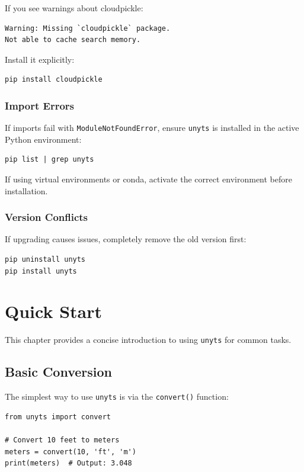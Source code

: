 \documentclass[11pt,a4paper]{report}
\begin{document}
If you see warnings about cloudpickle:
\begin{lstlisting}[style=bashstyle]
Warning: Missing `cloudpickle` package. 
Not able to cache search memory.
\end{lstlisting}

Install it explicitly:
\begin{lstlisting}[style=bashstyle]
pip install cloudpickle
\end{lstlisting}

\subsection{Import Errors}

If imports fail with \texttt{ModuleNotFoundError}, ensure \texttt{unyts} is installed in the active Python environment:
\begin{lstlisting}[style=bashstyle]
pip list | grep unyts
\end{lstlisting}

If using virtual environments or conda, activate the correct environment before installation.

\subsection{Version Conflicts}

If upgrading causes issues, completely remove the old version first:
\begin{lstlisting}[style=bashstyle]
pip uninstall unyts
pip install unyts
\end{lstlisting}


\chapter{Quick Start}

This chapter provides a concise introduction to using \texttt{unyts} for common tasks.

\section{Basic Conversion}

The simplest way to use \texttt{unyts} is via the \texttt{convert()} function:

\begin{lstlisting}[style=pythonstyle]
from unyts import convert

# Convert 10 feet to meters
meters = convert(10, 'ft', 'm')
print(meters)  # Output: 3.048
\end{lstlisting}
\end{document}
